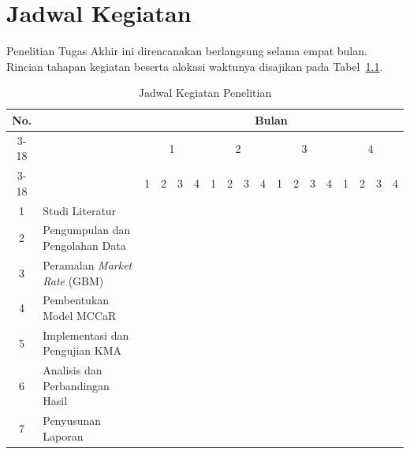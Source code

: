 \chapter{Jadwal Kegiatan}\label{ch:schedule}

Penelitian Tugas Akhir ini direncanakan berlangsung selama empat bulan. Rincian
tahapan kegiatan beserta alokasi waktunya disajikan pada
Tabel~\ref{tab:schedule}.

\begin{table}[!ht]
    \centering
    \footnotesize
    \caption{Jadwal Kegiatan Penelitian}
    \label{tab:schedule}
    \begin{tabular}{|c|>{\centering\arraybackslash}m{5.2cm}|*{16}{c|}}
        \hline
        \multirow{3}{*}{No.} & \multirow{3}{*}{Nama Kegiatan} & \multicolumn{16}{c|}{Bulan} \\ \cline{3-18}
        & & \multicolumn{4}{c|}{1} & \multicolumn{4}{c|}{2} & \multicolumn{4}{c|}{3} & \multicolumn{4}{c|}{4} \\ \cline{3-18}
        & & 1 & 2 & 3 & 4 & 1 & 2 & 3 & 4 & 1 & 2 & 3 & 4 & 1 & 2 & 3 & 4 \\ \hline
        1 & Studi Literatur & \cellcolor{black} & \cellcolor{black} & & & & & & & & & & & & & & \\ \hline
        2 & Pengumpulan dan Pengolahan Data & & \cellcolor{black} & \cellcolor{black} & \cellcolor{black} & & & & & & & & & & & & \\ \hline
        3 & Peramalan \textit{Market Rate} (GBM) & & & & \cellcolor{black} & \cellcolor{black} & \cellcolor{black} & & & & & & & & & & \\ \hline
        4 & Pembentukan Model MCCaR & & & & & \cellcolor{black} & \cellcolor{black} & \cellcolor{black} & & & & & & & & & \\ \hline
        5 & Implementasi dan Pengujian KMA & & & & & & & \cellcolor{black} & \cellcolor{black} & \cellcolor{black} & \cellcolor{black} & \cellcolor{black} & & & & & \\ \hline
        6 & Analisis dan Perbandingan Hasil & & & & & & & & & & \cellcolor{black} & \cellcolor{black} & \cellcolor{black} & \cellcolor{black} & & & \\ \hline
        7 & Penyusunan Laporan & & & & & & & & & & & & \cellcolor{black} & \cellcolor{black} & \cellcolor{black} & \cellcolor{black} & \cellcolor{black} \\ \hline
    \end{tabular}
\end{table}
